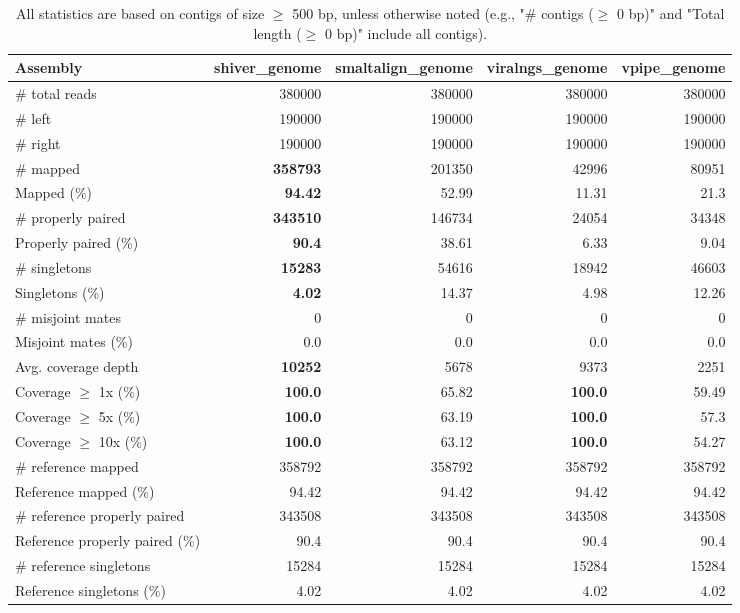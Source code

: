 \documentclass[12pt,a4paper]{article}
\begin{document}
\begin{table}[ht]
\begin{center}
\caption{All statistics are based on contigs of size $\geq$ 500 bp, unless otherwise noted (e.g., "\# contigs ($\geq$ 0 bp)" and "Total length ($\geq$ 0 bp)" include all contigs).}
\begin{tabular}{|l*{4}{|r}|}
\hline
Assembly & shiver\_genome & smaltalign\_genome & viralngs\_genome & vpipe\_genome \\ \hline
\# total reads & 380000 & 380000 & 380000 & 380000 \\ \hline
\# left & 190000 & 190000 & 190000 & 190000 \\ \hline
\# right & 190000 & 190000 & 190000 & 190000 \\ \hline
\# mapped & {\bf 358793} & 201350 & 42996 & 80951 \\ \hline
Mapped (\%) & {\bf 94.42} & 52.99 & 11.31 & 21.3 \\ \hline
\# properly paired & {\bf 343510} & 146734 & 24054 & 34348 \\ \hline
Properly paired (\%) & {\bf 90.4} & 38.61 & 6.33 & 9.04 \\ \hline
\# singletons & {\bf 15283} & 54616 & 18942 & 46603 \\ \hline
Singletons (\%) & {\bf 4.02} & 14.37 & 4.98 & 12.26 \\ \hline
\# misjoint mates & 0 & 0 & 0 & 0 \\ \hline
Misjoint mates (\%) & 0.0 & 0.0 & 0.0 & 0.0 \\ \hline
Avg. coverage depth & {\bf 10252} & 5678 & 9373 & 2251 \\ \hline
Coverage $\geq$ 1x (\%) & {\bf 100.0} & 65.82 & {\bf 100.0} & 59.49 \\ \hline
Coverage $\geq$ 5x (\%) & {\bf 100.0} & 63.19 & {\bf 100.0} & 57.3 \\ \hline
Coverage $\geq$ 10x (\%) & {\bf 100.0} & 63.12 & {\bf 100.0} & 54.27 \\ \hline
\# reference mapped & 358792 & 358792 & 358792 & 358792 \\ \hline
Reference mapped (\%) & 94.42 & 94.42 & 94.42 & 94.42 \\ \hline
\# reference properly paired & 343508 & 343508 & 343508 & 343508 \\ \hline
Reference properly paired (\%) & 90.4 & 90.4 & 90.4 & 90.4 \\ \hline
\# reference singletons & 15284 & 15284 & 15284 & 15284 \\ \hline
Reference singletons (\%) & 4.02 & 4.02 & 4.02 & 4.02 \\ \hline

\end{tabular}
\end{center}
\end{table}
\end{document}
